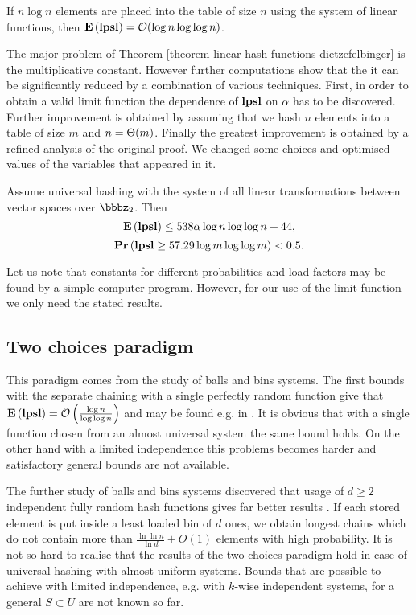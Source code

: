 \begin{theorem}{\cite{DBLP:journals/jacm/AlonDMPT99}}
\label{theorem-linear-hash-functions-dietzefelbinger}
If $n \log n$ elements are placed into the table of size $n$ using the system of linear functions, then $\mathbf{E}\left(\mathbf{lpsl}\right) = \mathcal{O}(\log n \log \log n)$. 
\end{theorem}

The major problem of Theorem \ref{theorem-linear-hash-functions-dietzefelbinger} is the multiplicative constant. However further computations show that the it can be significantly reduced by a combination of various techniques. First, in order to obtain a valid limit function the dependence of $\mathbf{lpsl}$ on $\alpha$ has to be discovered. Further improvement is obtained by assuming that we hash $n$ elements into a table of size $m$ and $n = \mathrm{\Theta}(m)$. Finally the greatest improvement is obtained by a refined analysis of the original proof. We changed some choices and optimised values of the variables that appeared in it.

\begin{theorem}
Assume universal hashing with the system of all linear transformations between vector spaces over $\bbbz_2$. Then $$\mathbf{E}\left(\mathbf{lpsl}\right) \leq 538 \alpha \log n \log \log n + 44,$$ $$\mathbf{Pr}\left(\mathbf{lpsl} \geq 57.29 \log m \log \log m\right) < 0.5.$$
\end{theorem}

Let us note that constants for different probabilities and load factors may be found by a simple computer program. However, for our use of the limit function we only need the stated results.

\subsection{Two choices paradigm}
This paradigm comes from the study of balls and bins systems. The first bounds with the separate chaining with a single perfectly random function give that $\mathbf{E}\left(\mathbf{lpsl}\right) = \mathcal{O}\left(\frac{\log n}{\log \log n}\right)$ and may be found e.g. in \cite{DBLP:books/sp/Mehlhorn84}. It is obvious that with a single function chosen from an almost universal system the same bound holds. On the other hand with a limited independence this problems becomes harder and satisfactory general bounds are not available.

The further study of balls and bins systems discovered that usage of $d \geq 2$ independent fully random hash functions gives far better results \cite{DBLP:conf/stoc/AzarBKU94}. If each stored element is put inside a least loaded bin of $d$ ones, we obtain longest chains which do not contain more than $\frac{\ln \ln n}{\ln d} + O(1)$ elements with high probability. It is not so hard to realise that the results of the two choices paradigm hold in case of universal hashing with almost uniform systems. Bounds that are possible to achieve with limited independence, e.g. with $k$-wise independent systems, for a general $S \subset U$ are not known so far.

